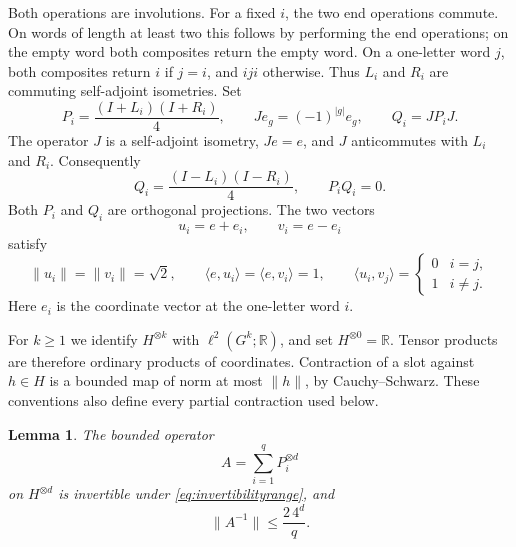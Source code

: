 \documentclass[11pt]{amsart}
\newtheorem{lemma}[theorem]{Lemma}
\newcommand{\R}{\mathbb R}
\newcommand{\ip}[2]{\langle #1,#2\rangle}
\begin{document}
Both operations are involutions. For a fixed $i$, the two end operations
commute. On words of length at least two this follows by performing the end
operations; on the empty word both composites return the empty word. On a
one-letter word $j$, both composites return $i$ if $j=i$, and $iji$ otherwise.
Thus $L_i$ and $R_i$ are commuting self-adjoint isometries. Set
\begin{equation}\label{eq:PQ}
P_i=\frac{(I+L_i)(I+R_i)}4,\qquad
J e_g=(-1)^{|g|}e_g,\qquad Q_i=JP_iJ.
\end{equation}
The operator $J$ is a self-adjoint isometry, $Je=e$, and $J$ anticommutes
with $L_i$ and $R_i$. Consequently
\[
Q_i=\frac{(I-L_i)(I-R_i)}4,\qquad P_iQ_i=0.
\]
Both $P_i$ and $Q_i$ are orthogonal projections. The two vectors
\begin{equation}\label{eq:uv}
u_i=e+e_i,\qquad v_i=e-e_i
\end{equation}
satisfy
\begin{equation}\label{eq:overlaps}
\|u_i\|=\|v_i\|=\sqrt2,\qquad
\ip e{u_i}=\ip e{v_i}=1,\qquad
\ip{u_i}{v_j}=\begin{cases}0&i=j,\\1&i\ne j.\end{cases}
\end{equation}
Here $e_i$ is the coordinate vector at the one-letter word $i$.

For $k\geq1$ we identify $H^{\otimes k}$ with $\ell^2(G^k;\R)$, and set
$H^{\otimes0}=\R$. Tensor products are therefore ordinary products of
coordinates. Contraction of a slot against $h\in H$ is a bounded map of norm
at most $\|h\|$, by Cauchy--Schwarz. These conventions also define every
partial contraction used below.

\begin{lemma}\label{lem:inverse}
The bounded operator
\[
A=\sum_{i=1}^q P_i^{\otimes d}
\]
on $H^{\otimes d}$ is invertible under \eqref{eq:invertibilityrange}, and
\begin{equation}\label{eq:inversebound}
\|A^{-1}\|\leq\frac{2\,4^d}{q}.
\end{equation}
\end{lemma}
\end{document}
